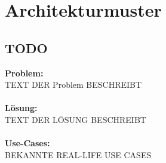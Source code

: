 \documentclass[../main.tex]{subfiles}
\begin{document}
	
	\section{Architekturmuster}
	
	\subsection{TODO}
	\textbf{Problem:}\\
	TEXT DER Problem BESCHREIBT\\\\
	\textbf{Lösung:}\\
	TEXT DER LÖSUNG BESCHREIBT\\\\
	\textbf{Use-Cases:}\\
	BEKANNTE REAL-LIFE USE CASES\\\\
	\clearpage
	
\end{document}
